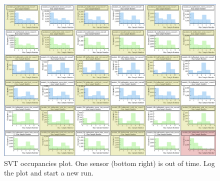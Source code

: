 \begin{figure}[ht!]
    \centering
    \includegraphics[width=\textwidth]{figures/maxsample_badhybrid}
    \caption{SVT occupancies plot. One sensor (bottom right) is out of time. Log the plot and start a new run.}
    \label{fig:maxsample_badhybrid}
\end{figure}


